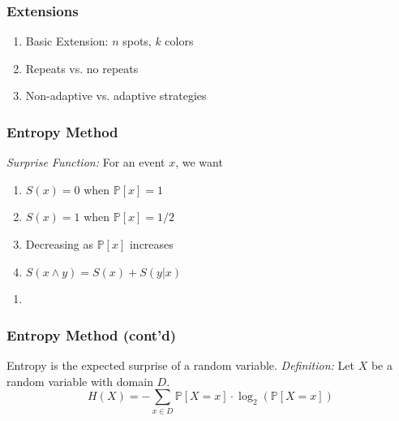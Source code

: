 \documentclass{beamer}
\begin{document}
    \begin{frame}
    	\frametitle{Extensions}
		\begin{enumerate}[label=\roman*.]
		\item Basic Extension: $n$ spots, $k$ colors
		\item Repeats vs. no repeats
		\item Non-adaptive vs. adaptive strategies
		\end{enumerate}
    \end{frame}
    
    \begin{frame}
    \frametitle{Entropy Method}
    \textit{Surprise Function:} For an event $x$, we want
    	\begin{enumerate}[label=\arabic*.]
		\item $S(x) = 0$ when $\mathbb{P}[x]=1$
		\item $S(x) = 1$ when $\mathbb{P}[x]=1/2$
		\item Decreasing as $\mathbb{P}[x]$ increases
		\item $S(x\land y) = S(x) + S(y|x)$
		\end{enumerate}
	\begin{enumerate}[label=]
	\item{}
	\end{enumerate}
	\end{frame}
	
	\begin{frame}
	\frametitle{Entropy Method (cont'd)}
	Entropy is the expected surprise of a random variable.
	\textit{Definition:} Let $X$ be a random variable with domain $D$.
			\begin{equation*}
			H(X) = -\sum_{x\in D}\mathbb{P}[X=x]\cdot\log_2\left(\mathbb{P}[X=x]\right)
			\end{equation*}
    \end{frame}
    
\end{document}
